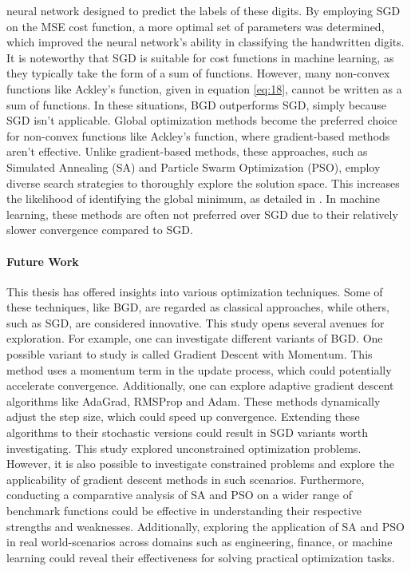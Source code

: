 neural network designed to predict the labels of these digits. By employing SGD on the MSE cost function, a more optimal set of parameters was determined, which improved the neural network's ability in classifying the handwritten digits. It is noteworthy that SGD is suitable for cost functions in machine learning, as they typically take the form of a sum of functions. However, many non-convex functions like Ackley's function, given in equation \eqref{eq:18}, cannot be written as a sum of functions. In these situations, BGD outperforms SGD, simply because SGD isn't applicable. Global optimization methods become the preferred choice for non-convex functions like Ackley's function, where gradient-based methods aren't effective. Unlike gradient-based methods, these approaches, such as Simulated Annealing (SA) and Particle Swarm Optimization (PSO), employ diverse search strategies to thoroughly explore the solution space. This increases the likelihood of identifying the global minimum, as detailed in \cite[1-5]{horst1995handbook}. In machine learning, these methods are often not preferred over SGD due to their relatively slower convergence compared to SGD.
\paragraph{Future Work}
This thesis has offered insights into various optimization techniques. Some of these techniques, like BGD, are regarded as classical approaches, while others, such as SGD, are considered innovative. This study opens several avenues for exploration. For example, one can investigate different variants of BGD. One possible variant to study is called Gradient Descent with Momentum. This method uses a momentum term in the update process, which could potentially accelerate convergence. Additionally, one can explore adaptive gradient descent algorithms like AdaGrad, RMSProp and Adam. These methods dynamically adjust the step size, which could speed up convergence. Extending these algorithms to their stochastic versions could result in SGD variants worth investigating. This study explored unconstrained optimization problems. However, it is also possible to investigate constrained problems and explore the applicability of gradient descent methods in such scenarios. Furthermore, conducting a comparative analysis of SA and PSO on a wider range of benchmark functions could be effective in understanding their respective strengths and weaknesses. Additionally, exploring the application of SA and PSO in real world-scenarios across domains such as engineering, finance, or machine learning could reveal their effectiveness for solving practical optimization tasks.